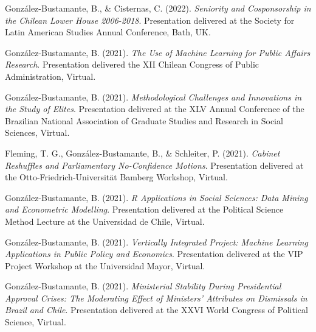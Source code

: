 \begin{publications}
\begin{benumerate}{71}
\item{\small González-Bustamante, B., \& Cisternas, C. (2022). {\itshape Seniority and Cosponsorship in the Chilean Lower House 2006-2018}. Presentation delivered at the Society for Latin American Studies Annual Conference, Bath, UK.}\vspace{1mm}

\item{\small González-Bustamante, B. (2021). {\itshape The Use of Machine Learning for Public Affairs Research}. Presentation delivered the XII Chilean Congress of Public Administration, Virtual.}\vspace{1mm}

\item{\small González-Bustamante, B. (2021). {\itshape Methodological Challenges and Innovations in the Study of Elites}. Presentation delivered at the XLV Annual Conference of the Brazilian National Association of Graduate Studies and Research in Social Sciences, Virtual.}\vspace{1mm}

\item{\small Fleming, T. G., González-Bustamante, B., \& Schleiter, P. (2021). {\itshape Cabinet Reshuffles and Parliamentary No-Confidence Motions}. Presentation delivered at the Otto-Friedrich-Universität Bamberg Workshop, Virtual.}\vspace{1mm}

\item{\small González-Bustamante, B. (2021). {\itshape R Applications in Social Sciences: Data Mining and Econometric Modelling}. Presentation delivered at the Political Science Method Lecture at the Universidad de Chile, Virtual.}\vspace{1mm}

\item{\small González-Bustamante, B. (2021). {\itshape Vertically Integrated Project: Machine Learning Applications in Public Policy and Economics}. Presentation delivered at the VIP Project Workshop at the Universidad Mayor, Virtual.}\vspace{1mm}

\item{\small González-Bustamante, B. (2021). {\itshape Ministerial Stability During Presidential Approval Crises: The Moderating Effect of Ministers' Attributes on Dismissals in Brazil and Chile}. Presentation delivered at the XXVI World Congress of Political Science, Virtual.}\vspace{1mm}


\end{benumerate}
\end{publications}
